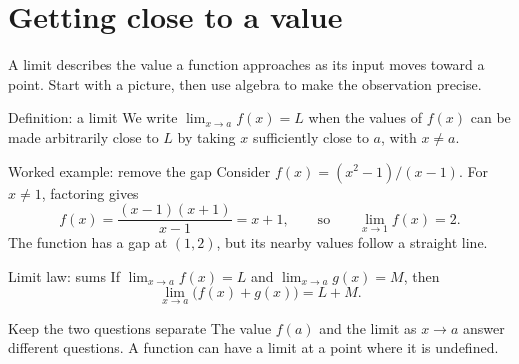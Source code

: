 \section{Getting close to a value}
A limit describes the value a function approaches as its input moves toward a point. Start with a picture, then use algebra to make the observation precise.

\begin{definitionbox}{Definition: a limit}
We write $\lim_{x\to a}f(x)=L$ when the values of $f(x)$ can be made arbitrarily close to $L$ by taking $x$ sufficiently close to $a$, with $x\ne a$.
\end{definitionbox}

\begin{examplebox}{Worked example: remove the gap}
Consider $f(x)=(x^2-1)/(x-1)$. For $x\ne 1$, factoring gives
\[
 f(x)=\frac{(x-1)(x+1)}{x-1}=x+1,
 \qquad \text{so}\qquad \lim_{x\to1}f(x)=2.
\]
The function has a gap at $(1,2)$, but its nearby values follow a straight line.
\begin{center}
\end{center}
\end{examplebox}

\begin{theorembox}{Limit law: sums}
If $\lim_{x\to a}f(x)=L$ and $\lim_{x\to a}g(x)=M$, then
\[
 \lim_{x\to a}\bigl(f(x)+g(x)\bigr)=L+M.
\]
\end{theorembox}

\begin{remarkbox}{Keep the two questions separate}
The value $f(a)$ and the limit as $x\to a$ answer different questions. A function can have a limit at a point where it is undefined.
\end{remarkbox}
